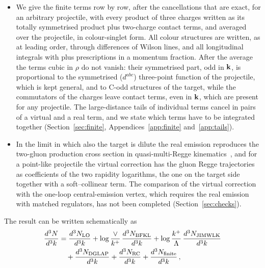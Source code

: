\begin{itemize}
\item We give the finite terms row by row, after the cancellations that are exact, for an arbitrary projectile, with every product of three charges written as its totally symmetrised product plus two-charge contact terms, and averaged over the projectile, in colour-singlet form. All colour structures are written, as at leading order, through differences of Wilson lines, and all longitudinal integrals with plus prescriptions in a momentum fraction. After the average the terms cubic in $\rho$ do not vanish: their symmetrised part, odd in $\mathbf{k}$, is proportional to the symmetrised ($d^{abc}$) three-point function of the projectile, which is kept general, and to C-odd structures of the target, while the commutators of the charges leave contact terms, even in $\mathbf{k}$, which are present for any projectile. The large-distance tails of individual terms cancel in pairs of a virtual and a real term, and we state which terms have to be integrated together (Section~\ref{sec:finite}, Appendices~\ref{app:finite} and~\ref{app:tails}).
\item In the limit in which also the target is dilute the real emission reproduces the two-gluon production cross section in quasi-multi-Regge kinematics~\cite{Fadin:1998py,Bartels:2006hg}, and for a point-like projectile the virtual correction has the gluon Regge trajectories as coefficients of the two rapidity logarithms, the one on the target side together with a soft--collinear term. The comparison of the virtual correction with the one-loop central-emission vertex, which requires the real emission with matched regulators, has not been completed (Section~\ref{sec:checks}).
\end{itemize}
The result can be written schematically as
\begin{align}\label{eq:schematic}
\frac{d^3N}{d^3k} &= \frac{d^3N_{\rm LO}}{d^3k}
+ \log\frac{\vee}{k^+}\,\frac{d^3N_{\rm BFKL}}{d^3k}
+ \log\frac{k^+}{\Lambda}\,\frac{d^3N_{\rm JIMWLK}}{d^3k}\notag\\
&\quad+ \frac{d^3N_{\rm DGLAP}}{d^3k}
+ \frac{d^3N_{\rm RC}}{d^3k}
+ \frac{d^3N_{\rm finite}}{d^3k}\,,
\end{align}
